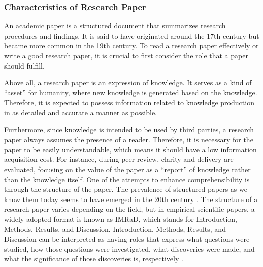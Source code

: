 \documentclass{book}
\begin{document}


\subsubsection{Characteristics of Research Paper}
An academic paper is a structured document that summarizes research procedures and findings. It is said to have originated around the 17th century but became more common in the 19th century. To read a research paper effectively or write a good research paper, it is crucial to first consider the role that a paper should fulfill. 

Above all, a research paper is an expression of knowledge. It serves as a kind of ``asset'' for humanity, where new knowledge is generated based on the knowledge. Therefore, it is expected to possess information related to knowledge production in as detailed and accurate a manner as possible.

Furthermore, since knowledge is intended to be used by third parties, a research paper always assumes the presence of a reader. Therefore, it is necessary for the paper to be easily understandable, which means it should have a low information acquisition cost. For instance, during peer review, clarity and delivery are evaluated, focusing on the value of the paper as a ``report'' of knowledge rather than the knowledge itself. One of the attempts to enhance comprehensibility is through the structure of the paper. The prevalence of structured papers as we know them today seems to have emerged in the 20th century \cite{harmon1989structure}. 
The structure of a research paper varies depending on the field, but in empirical scientific papers, a widely adopted format is known as IMRaD, which stands for Introduction, Methods, Results, and Discussion. Introduction, Methods, Results, and Discussion can be interpreted as having roles that express what questions were studied, how those questions were investigated, what discoveries were made, and what the significance of those discoveries is, respectively \cite{gastel2022write}.
\end{document}
